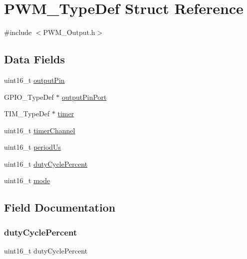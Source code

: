 \hypertarget{struct_p_w_m___type_def}{}\section{P\+W\+M\+\_\+\+Type\+Def Struct Reference}
\label{struct_p_w_m___type_def}


{\ttfamily \#include $<$P\+W\+M\+\_\+\+Output.\+h$>$}

\subsection*{Data Fields}
\begin{DoxyCompactItemize}
\item 
uint16\+\_\+t \hyperlink{struct_p_w_m___type_def_ac9de390b24b0d2e907571cccb9d6d2b9}{output\+Pin}
\item 
G\+P\+I\+O\+\_\+\+Type\+Def $\ast$ \hyperlink{struct_p_w_m___type_def_a078cbe468c9fd678c2f5bb96ba35f845}{output\+Pin\+Port}
\item 
T\+I\+M\+\_\+\+Type\+Def $\ast$ \hyperlink{struct_p_w_m___type_def_a5f2d7e0e880def3262a850626e3df17d}{timer}
\item 
uint16\+\_\+t \hyperlink{struct_p_w_m___type_def_a2ceeb6205773419966e920a22828f526}{timer\+Channel}
\item 
uint16\+\_\+t \hyperlink{struct_p_w_m___type_def_a550f3d976917596f0228732fceab7490}{period\+Us}
\item 
uint16\+\_\+t \hyperlink{struct_p_w_m___type_def_a43833ca434f7e3c7d23ff9f780825da3}{duty\+Cycle\+Percent}
\item 
uint16\+\_\+t \hyperlink{struct_p_w_m___type_def_af294e94ca5176720ef5e5cbedc95ca47}{mode}
\end{DoxyCompactItemize}


\subsection{Field Documentation}
\mbox{\label{struct_p_w_m___type_def_a43833ca434f7e3c7d23ff9f780825da3}} 
\subsubsection{\texorpdfstring{duty\+Cycle\+Percent}{dutyCyclePercent}}
{\footnotesize\ttfamily uint16\+\_\+t duty\+Cycle\+Percent}

